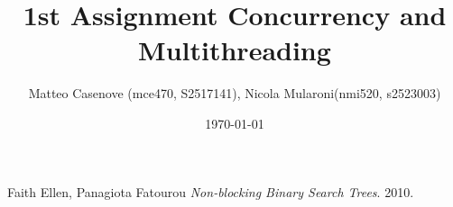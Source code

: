 \documentclass[]{article}
\title{1st Assignment Concurrency and Multithreading}
\author{Matteo Casenove (mce470, S2517141), Nicola Mularoni(nmi520, s2523003)}
\date{\today}
\begin{document}

\maketitle

















%
%

\begin{thebibliography}{9}

  Faith Ellen, Panagiota Fatourou
  \emph{Non-blocking Binary Search Trees}.
  2010.

\end{thebibliography}
\end{document}
